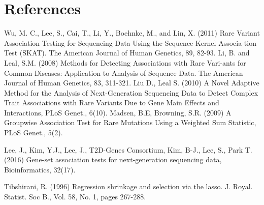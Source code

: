 \documentclass{article}
\begin{document}
\section{References}
\begin{thebibliography}{00}

 Wu, M. C., Lee, S., Cai, T., Li, Y., Boehnke, M., and Lin, X. (2011) 
Rare Variant Association Testing for Sequencing Data Using the Sequence 
Kernel Associa-tion Test (SKAT). The American Journal of 
Human Genetics, 89, 82-93.
 Li, B. and Leal, S.M. (2008) Methods for Detecting Associations 
with Rare Vari-ants for Common Diseases: Application to Analysis 
of Sequence Data. The American Journal of Human Genetics, 83, 311-321.
 Liu D., Leal S. (2010) A Novel Adaptive Method for the Analysis 
of Next-Generation Sequencing Data to Detect Complex Trait 
Associations with Rare Variants Due to Gene Main Effects and 
Interactions, PLoS Genet., 6(10).
 Madsen, B.E, Browning, S.R. (2009) A Groupwise Association 
Test for Rare Mutations Using a Weighted Sum Statistic, PLoS Genet., 5(2).

 Lee, J., Kim, Y.J., Lee, J., T2D-Genes Consortium, Kim, B-J., 
Lee, S., Park T. (2016) Gene-set association tests for 
next-generation sequencing data, Bioinformatics, 32(17).

 Tibshirani, R. (1996) Regression shrinkage and selection 
via the lasso. J. Royal. Statist. Soc B., Vol. 58, No. 1, pages 267-288.
\end{thebibliography}
\end{document}
